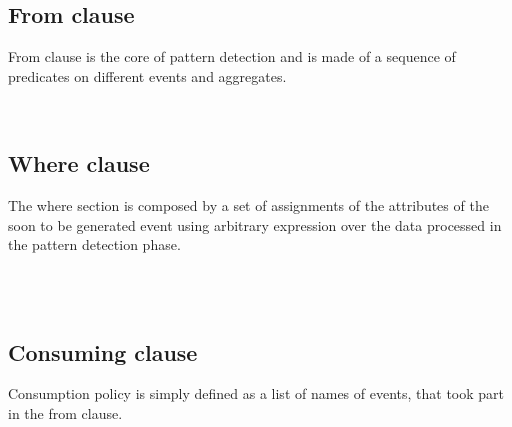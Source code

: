 \subsection{From clause}
From clause is the core of pattern detection and is made of a sequence of predicates on different events and aggregates.
\begin{bnf*}
\end{bnf*}
\begin{bnf*}
\\
\end{bnf*}

\subsection{Where clause}
The where section is composed by a set of assignments of the attributes of the soon to be generated event using arbitrary expression over the data processed in the pattern detection phase.
\begin{bnf*}
\end{bnf*}
\begin{bnf*}
\\
\\
\end{bnf*}

\subsection{Consuming clause}
Consumption policy is simply defined as a list of names of events, that took part in the from clause. 
\begin{bnf*}
\end{bnf*}

